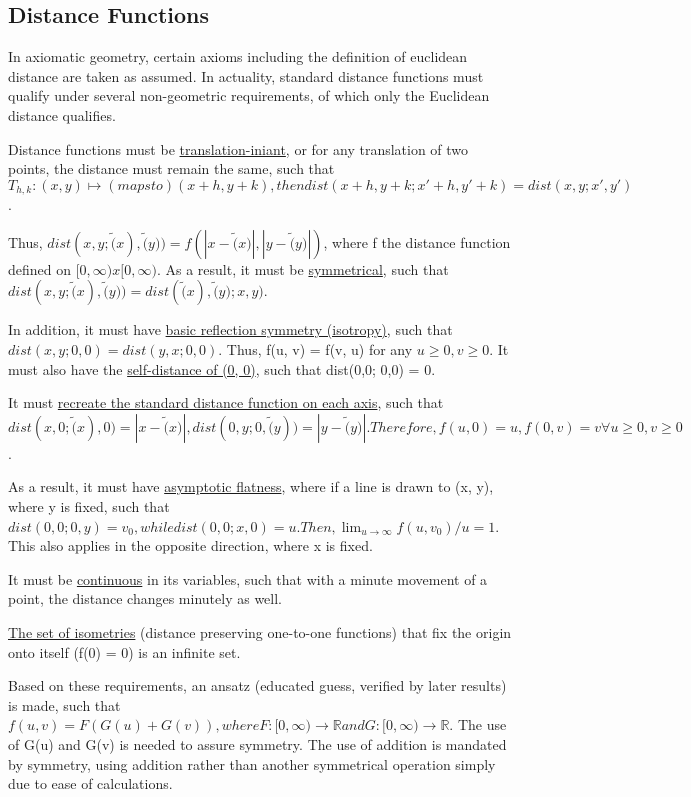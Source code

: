 \subsection{Distance Functions}
In axiomatic geometry, certain axioms including the definition of euclidean distance are taken as assumed. In actuality, standard distance functions must qualify under several non-geometric requirements, of which only the Euclidean distance qualifies.

Distance functions must be \underline{translation-iniant}, or for any translation of two points, the distance must remain the same, such that $T_{h, k}: (x, y) \mapsto (maps to) (x+h, y+k), then dist(x+h, y+k; x'+h, y'+k) = dist(x, y; x', y')$. 

Thus, $dist(x,y; \tilde(x), \tilde(y)) = f(|x-\tilde(x)|, |y-\tilde(y)|)$, where f the distance function defined on $[0, \infty) x [0, \infty).$ As a result, it must be \underline{symmetrical}, such that $dist(x, y; \tilde(x), \tilde(y)) = dist(\tilde(x), \tilde(y); x, y)$.

In addition, it must have \underline{basic reflection symmetry (isotropy)}, such that $dist(x, y; 0, 0) = dist(y, x; 0, 0)$. Thus, f(u, v) = f(v, u) for any $u \geq 0, v \geq 0$. It must also have the \underline{self-distance of (0, 0)}, such that dist(0,0; 0,0) = 0.

It must \underline{recreate the standard distance function on each axis}, such that $dist(x,0; \tilde(x), 0) = |x - \tilde(x)|, dist(0, y; 0, \tilde(y)) = |y - \tilde(y)|. Therefore, f(u, 0) = u, f(0, v) = v \forall u \geq 0, v \geq 0$.

As a result, it must have \underline{asymptotic flatness}, where if a line is drawn to (x, y), where y is fixed, such that $dist(0,0; 0, y) = v_0, while dist(0, 0; x, 0) = u. Then, \lim_{u \to \infty} f(u, v_0)/u = 1$. This also applies in the opposite direction, where x is fixed.

It must be \underline{continuous} in its variables, such that with a minute movement of a point, the distance changes minutely as well.

\underline{The set of isometries} (distance preserving one-to-one functions) that fix the origin onto itself (f(0) = 0) is an infinite set.

Based on these requirements, an ansatz (educated guess, verified by later results) is made, such that $f(u, v) = F(G(u) + G(v)), where F: [0, \infty) \to \mathbb{R} and G: [0, \infty) \to \mathbb{R}$. The use of G(u) and G(v) is needed to assure symmetry. The use of addition is mandated by symmetry, using addition rather than another symmetrical operation simply due to ease of calculations.

